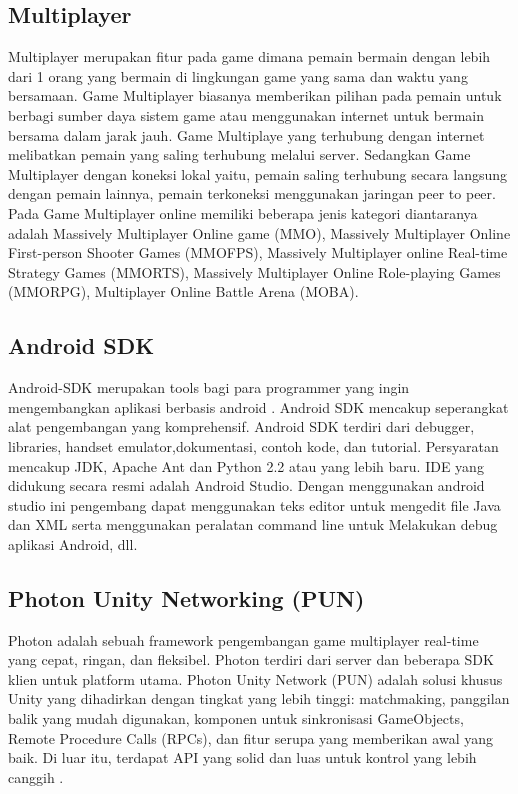 \subsection{Multiplayer}
Multiplayer merupakan fitur pada game dimana pemain bermain dengan lebih dari 1 orang yang bermain 
di lingkungan game yang sama dan waktu yang bersamaan. Game Multiplayer biasanya memberikan pilihan pada 
pemain untuk berbagi sumber daya sistem game atau menggunakan internet untuk bermain bersama dalam jarak 
jauh. Game Multiplaye yang terhubung dengan internet melibatkan pemain yang saling terhubung melalui server. 
Sedangkan Game Multiplayer dengan koneksi lokal yaitu, pemain saling terhubung secara langsung dengan 
pemain lainnya, pemain terkoneksi menggunakan jaringan peer to peer. Pada Game Multiplayer online memiliki 
beberapa jenis kategori diantaranya adalah Massively Multiplayer Online game (MMO), Massively Multiplayer 
Online First-person Shooter Games (MMOFPS), Massively Multiplayer online Real-time Strategy Games
(MMORTS), Massively Multiplayer Online Role-playing Games (MMORPG), Multiplayer Online Battle Arena
(MOBA).\cite{Ansori}

\subsection{Android SDK}
Android-SDK merupakan tools bagi para programmer yang 
ingin mengembangkan aplikasi berbasis android \cite{androidsdk}. Android SDK 
mencakup seperangkat alat pengembangan yang komprehensif. 
Android SDK terdiri dari debugger, libraries, handset
emulator,dokumentasi, contoh kode, dan tutorial. Persyaratan 
mencakup JDK, Apache Ant dan Python 2.2 atau yang lebih baru. 
IDE yang didukung secara resmi adalah Android Studio. Dengan 
menggunakan android studio ini pengembang dapat menggunakan 
teks editor untuk mengedit file Java dan XML serta menggunakan 
peralatan command line untuk Melakukan debug aplikasi Android, dll.


\subsection{Photon Unity Networking (PUN)}
Photon adalah sebuah framework pengembangan game multiplayer real-time yang cepat, ringan, dan fleksibel. Photon terdiri dari server dan beberapa SDK klien untuk platform utama.
Photon Unity Network (PUN) adalah solusi khusus Unity yang dihadirkan dengan tingkat yang lebih tinggi: matchmaking, panggilan balik yang mudah digunakan, komponen untuk sinkronisasi GameObjects, Remote Procedure Calls (RPCs), dan fitur serupa yang memberikan awal yang baik. Di luar itu, terdapat API yang solid dan luas untuk kontrol yang lebih canggih \cite{pun}.

